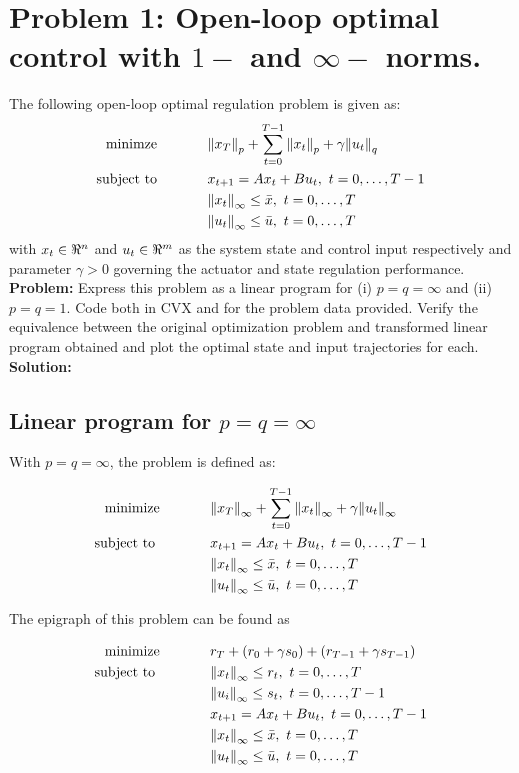 \documentclass[letter]{article}
\newcommand{\optpblm}[3][eq:default]{
	\begin{equation}\label{#1}
		\begin{aligned}
			\text{minimize} \hspace{0.5in} &#2\vspace{5pt}\\
			\text{subject to \hspace{0.5in}} &#3
		\end{aligned}	
	\end{equation}
}
\begin{document}

\newpage
\section{Problem 1: Open-loop optimal control with $1-$ and $\infty-$ norms.}
The following open-loop optimal regulation problem is given as:
\begin{equation}\label{eq:open-loop_opt-control_def}
	\begin{aligned}
		\text{minimze} \hspace{0.5in}
		&\norm{x_T}_p + \sum_{t = 0}^{T-1} \norm{x_t}_p + \gamma\norm{u_t}_q\\
		\text{subject to} \hspace{0.5in}
		& x_{t+1} = A x_t + B u_t, \ t = 0,\dots,T-1\\
		& \norm{x_t}_\infty \leq \bar{x}, \ t = 0,\dots,T\\
		& \norm{u_t}_\infty \leq \bar{u}, \ t = 0,\dots,T
	\end{aligned}
\end{equation}
with $x_t \in \real^n$ and $u_t \in \real^m$ as the system state and control input respectively and parameter $\gamma > 0$ governing the actuator and state regulation performance.\\

\textbf{Problem:}
Express this problem as a linear program for (i) $p=q=\infty$ and (ii) $p=q=1$. Code both in CVX and for the problem data provided. Verify the equivalence between the original optimization problem and transformed linear program obtained and plot the optimal state and input trajectories for each.\\

\textbf{Solution:}
\subsection{Linear program for $p = q = \infty$}

With $p = q = \infty$, the problem is defined as:
\optpblm{\norm{x_T}_\infty + \sum_{t = 0}^{T-1} \norm{x_t}_\infty + \gamma\norm{u_t}_\infty}{
	x_{t+1} = A x_t + B u_t, \ t = 0,\dots,T-1\\
	& \norm{x_t}_\infty \leq \bar{x}, \ t = 0,\dots,T\\
	& \norm{u_t}_\infty \leq \bar{u}, \ t = 0,\dots,T}

The epigraph of this problem can be found as
\optpblm{r_T + (r_0 + \gamma s_0) + (r_{T-1} + \gamma s_{T-1})}{
	\norm{x_t}_\infty \leq r_t, \ t = 0, \dots, T\\
	&\norm{u_i}_\infty \leq s_t, \ t = 0, \dots, T-1\\
	&x_{t+1} = A x_t + B u_t, \ t = 0,\dots,T-1\\
	& \norm{x_t}_\infty \leq \bar{x}, \ t = 0,\dots,T\\
	& \norm{u_t}_\infty \leq \bar{u}, \ t = 0,\dots,T
	}
\end{document}
